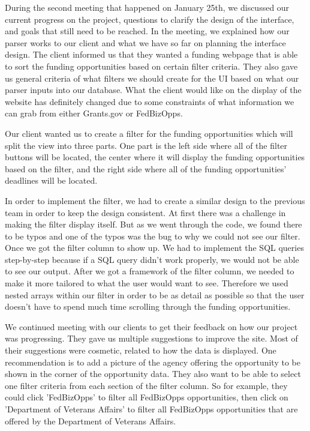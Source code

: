 \documentclass[onecolumn]{IEEEtran}
\begin{document}
During the second meeting that happened on January 25th, we discussed our current progress on the project, questions to clarify the design of the interface, and goals that still need to be reached. In the meeting, we explained how our parser works to our client and what we have so far on planning the interface design. The client informed us that they wanted a funding webpage that is able to sort the funding opportunities based on certain filter criteria. They also gave us general criteria of what filters we should create for the UI based on what our parser inputs into our database. What the client would like on the display of the website has definitely changed due to some constraints of what information we can grab from either Grants.gov or FedBizOpps. 

Our client wanted us to create a filter for the funding opportunities which will split the view into three parts. One part is the left side where all of the filter buttons will be located, the center where it will display the funding opportunities based on the filter, and the right side where all of the funding opportunities' deadlines will be located. 

In order to implement the filter, we had to create a similar design to the previous team in order to keep the design consistent. At first there was a challenge in making the filter display itself. But as we went through the code, we found there to be typos and one of the typos was the bug to why we could not see our filter. Once we got the filter column to show up. We had to implement the SQL queries step-by-step because if a SQL query didn't work properly, we would not be able to see our output. After we got a framework of the filter column, we needed to make it more tailored to what the user would want to see. Therefore we used nested arrays within our filter in order to be as detail as possible so that the user doesn't have to spend much time scrolling through the funding opportunities.

We continued meeting with our clients to get their feedback on how our project was progressing. They gave us multiple suggestions to improve the site. Most of their suggestions were cosmetic, related to how the data is displayed. One recommendation is to add a picture of the agency offering the opportunity to be shown in the corner of the opportunity data. They also want to be able to select one filter criteria from each section of the filter column. So for example, they could click 'FedBizOpps' to filter all FedBizOpps opportunities, then click on 'Department of Veterans Affairs' to filter all FedBizOpps opportunities that are offered by the Department of Veterans Affairs.
\end{document}
